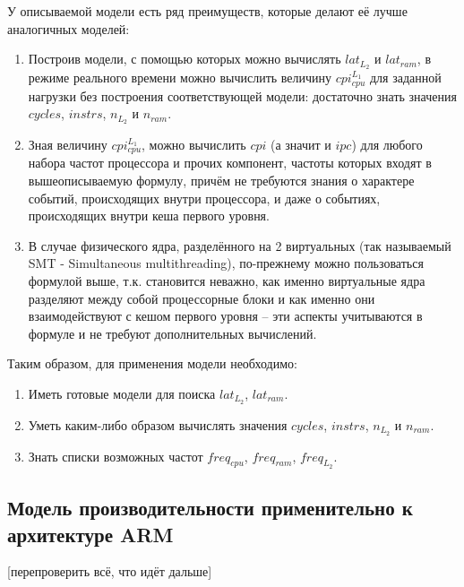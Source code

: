     У описываемой модели есть ряд преимуществ, которые делают её лучше аналогичных моделей:
    \begin{enumerate}
        \item Построив модели, с помощью которых можно вычислять $lat_{L_2}$ и $lat_{ram}$,
        в режиме реального времени можно вычислить величину $cpi_{cpu}^{L_1}$ для
        заданной нагрузки без построения соответствующей модели: достаточно знать значения
        $cycles$, $instrs$, $n_{L_2}$ и $n_{ram}$.
        \item Зная величину $cpi_{cpu}^{L_1}$, можно вычислить $cpi$ (а значит и $ipc$)
        для любого набора частот процессора и прочих компонент, частоты которых входят в
        вышеописываемую формулу, причём не требуются знания о характере событий,
        происходящих внутри процессора, и даже о событиях, происходящих внутри кеша первого уровня.
        \item В случае физического ядра, разделённого на 2 виртуальных (так называемый
        SMT - Simultaneous multithreading), по-прежнему можно пользоваться формулой выше, т.к.
        становится неважно, как именно виртуальные ядра разделяют между собой процессорные блоки
        и как именно они взаимодействуют с кешом первого уровня -- эти аспекты учитываются
        в формуле и не требуют дополнительных вычислений.
    \end{enumerate}

    Таким образом, для применения модели необходимо:
    \begin{enumerate}
        \item Иметь готовые модели для поиска $lat_{L_2}$, $lat_{ram}$.
        \item Уметь каким-либо образом вычислять значения $cycles$, $instrs$, $n_{L_2}$ и $n_{ram}$.
        \item Знать списки возможных частот $freq_{cpu}$, $freq_{ram}$, $freq_{L_2}$.
    \end{enumerate}

\subsection{Модель производительности применительно к архитектуре ARM}

    [перепроверить всё, что идёт дальше]

